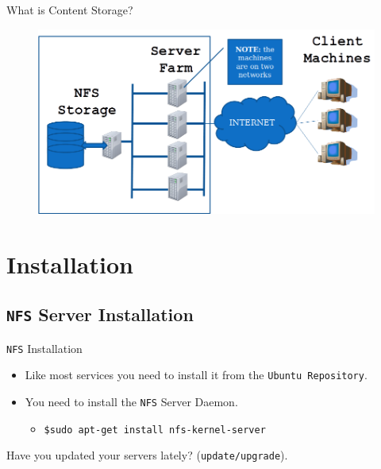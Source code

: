 \documentclass[xcolor=table]{beamer}
\begin{document}
\begin{frame}{What is Content Storage?}
  \begin{figure}
    \begin{center}
      \includegraphics[width=1\linewidth]{WhatIs.png}
    \end{center}
  \end{figure}
\end{frame}

\section{Installation}
\subsection{\texttt{NFS} Server Installation}
\begin{frame}{\texttt{NFS} Installation}
  \begin{itemize}
    \item Like most services you need to install it from the \texttt{Ubuntu Repository}.
    \item You need to install the \texttt{NFS} Server Daemon.
      \begin{itemize}
        \item \texttt{\$sudo apt-get install nfs-kernel-server}
      \end{itemize}
  \end{itemize}
  \begin{tcolorbox}
    \begin{center}
      \scriptsize Have you updated your servers lately? (\texttt{update/upgrade}).
    \end{center}
  \end{tcolorbox}
\end{frame}
\end{document}
